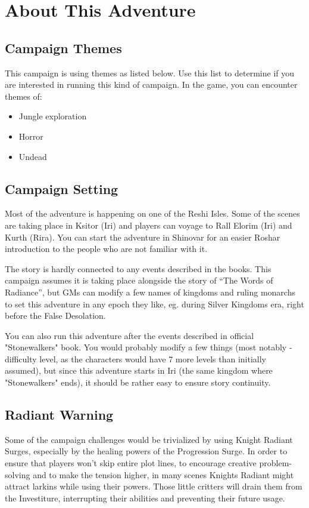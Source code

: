 \section{About This Adventure}
\label{sec:aboutAdventure}

\subsection{Campaign Themes}

This campaign is using themes as listed below. Use this list to determine if you are interested in running this kind of campaign. In the game, you can encounter themes of:
\begin{itemize}
	\item Jungle exploration
	\item Horror
	\item Undead
\end{itemize}

\subsection{Campaign Setting}

Most of the adventure is happening on one of the Reshi Isles. Some of the scenes are taking place in Ksitor (Iri) and players can voyage to Rall Elorim (Iri) and Kurth (Rira). You can start the adventure in Shinovar for an easier Roshar introduction to the people who are not familiar with it.

The story is hardly connected to any events described in the books. This campaign assumes it is taking place alongside the story of “The Words of Radiance”, but GMs can modify a few names of kingdoms and ruling monarchs to set this adventure in any epoch they like, eg. during Silver Kingdoms era, right before the False Desolation.

You can also run this adventure after the events described in official "Stonewalkers" book. You would probably modify a few things (most notably - difficulty level, as the characters would have 7 more levels than initially assumed), but since this adventure starts in Iri (the same kingdom where "Stonewalkers" ends), it should be rather easy to ensure story continuity.

\subsection{Radiant Warning}

Some of the campaign challenges would be trivialized by using Knight Radiant Surges, especially by the healing powers of the Progression Surge. In order to ensure that players won’t skip entire plot lines, to encourage creative problem-solving and to make the tension higher, in many scenes Knights Radiant might attract larkins while using their powers. Those little critters will drain them from the Investiture, interrupting their abilities and preventing their future usage.

